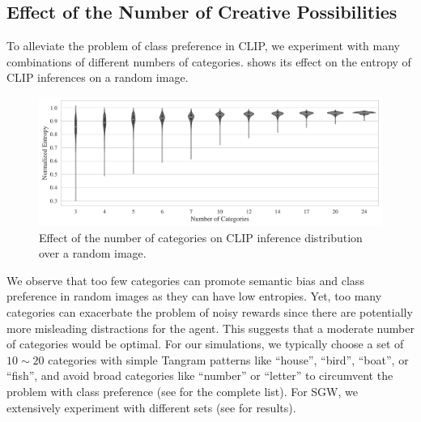 
\subsection{Effect of the Number of Creative Possibilities}
\label{sec:clip-categories}
To alleviate the problem of class preference in CLIP, we experiment with many combinations of different numbers of categories.
 shows its effect on the entropy of CLIP inferences on a random image.

\begin{figure}[H]
    \centering
    \includegraphics[width=\textwidth]{images/category_comparison_tangram.pdf}
    \caption{Effect of the number of categories on CLIP inference distribution over a random image.}
    \label{fig:clip-categories}
\end{figure}
\vspace{-7pt}
We observe that too few categories can promote semantic bias and class preference in random images as they can have low entropies. Yet, too many categories can exacerbate the problem of noisy rewards since there are potentially more misleading distractions for the agent.
This suggests that a moderate number of categories would be optimal.
For our simulations, we typically choose a set of \(10 \sim 20\) categories with simple Tangram patterns like ``house'', ``bird'', ``boat'', or ``fish'', and avoid broad categories like ``number'' or ``letter'' to circumvent the problem with class preference (see  for the complete list).
For SGW, we extensively experiment with different sets (see  for results).


